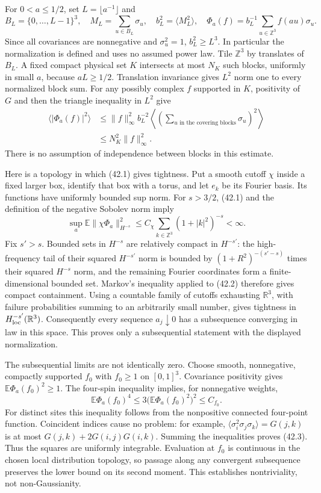 \documentclass[11pt,a4paper]{article}
\newcommand{\Z}{\mathbb{Z}}
\newcommand{\R}{\mathbb{R}}
\newcommand{\E}{\mathbb{E}}
\numberwithin{equation}{section}
\begin{document}
For $0<a\le1/2$, set $L=\lfloor a^{-1}\rfloor$ and
\[
 B_L=\{0,\ldots,L-1\}^3,\quad M_L=\sum_{u\in B_L}\sigma_u,
 \quad b_L^2=\langle M_L^2\rangle,\quad
 \Phi_a(f)=b_L^{-1}\sum_{u\in\Z^3}f(au)\sigma_u.
\]
Since all covariances are nonnegative and $\sigma_u^2=1$, $b_L^2\ge L^3$.
In particular the normalization is defined and uses no assumed power law.
Tile $\Z^3$ by translates of $B_L$. A fixed compact physical set $K$
intersects at most $N_K$ such blocks, uniformly in small $a$, because
$aL\ge1/2$. Translation invariance gives $L^2$ norm one to every normalized
block sum. For any possibly complex $f$ supported in $K$, positivity of $G$
and then the triangle inequality in $L^2$ give
\begin{align*}
 \langle |\Phi_a(f)|^2\rangle
 &\le \|f\|_\infty^2 b_L^{-2}
       \left\langle\left(\sum_{u\text{ in the covering blocks}}
                      \sigma_u\right)^2\right\rangle\\
 &\le N_K^2\|f\|_\infty^2. \tag{42.1}
\end{align*}
There is no assumption of independence between blocks in this estimate.

Here is a topology in which (42.1) gives tightness. Put a smooth cutoff
$\chi$ inside a fixed larger box, identify that box with a torus, and let
$e_k$ be its Fourier basis. Its functions have uniformly bounded sup norm.
For $s>3/2$, (42.1) and the definition of the negative Sobolev norm imply
\[
 \sup_a\E\|\chi\Phi_a\|_{H^{-s}}^2
 \le C_\chi\sum_{k\in\Z^3}(1+|k|^2)^{-s}<\infty. \tag{42.2}
\]
Fix $s'>s$. Bounded sets in $H^{-s}$ are relatively compact in $H^{-s'}$:
the high-frequency tail of their squared $H^{-s'}$ norm is bounded by
$(1+R^2)^{-(s'-s)}$ times their squared $H^{-s}$ norm, and the remaining
Fourier coordinates form a finite-dimensional bounded set. Markov's
inequality applied to (42.2) therefore gives compact containment. Using a
countable family of cutoffs exhausting $\R^3$, with failure probabilities
summing to an arbitrarily small number, gives tightness in
$H^{-s'}_{\rm loc}(\R^3)$. Consequently every sequence $a_j\downarrow0$
has a subsequence converging in law in this space. This proves only a
subsequential statement with the displayed normalization.

The subsequential limits are not identically zero. Choose smooth,
nonnegative, compactly supported $f_0$ with $f_0\ge1$ on $[0,1]^3$.
Covariance positivity gives $\E\Phi_a(f_0)^2\ge1$. The four-spin inequality
implies, for nonnegative weights,
\[
 \E\Phi_a(f_0)^4\le3\bigl(\E\Phi_a(f_0)^2\bigr)^2\le C_{f_0}.
 \tag{42.3}
\]
For distinct sites this inequality follows from the nonpositive connected
four-point function. Coincident indices cause no problem: for example,
$\langle\sigma_i^2\sigma_j\sigma_k\rangle=G(j,k)$ is at most
$G(j,k)+2G(i,j)G(i,k)$. Summing the inequalities proves (42.3).
Thus the squares are uniformly integrable. Evaluation at $f_0$ is
continuous in the chosen local distribution topology, so passage along
any convergent subsequence preserves the lower bound on its second
moment. This establishes nontriviality, not non-Gaussianity.
\end{document}
